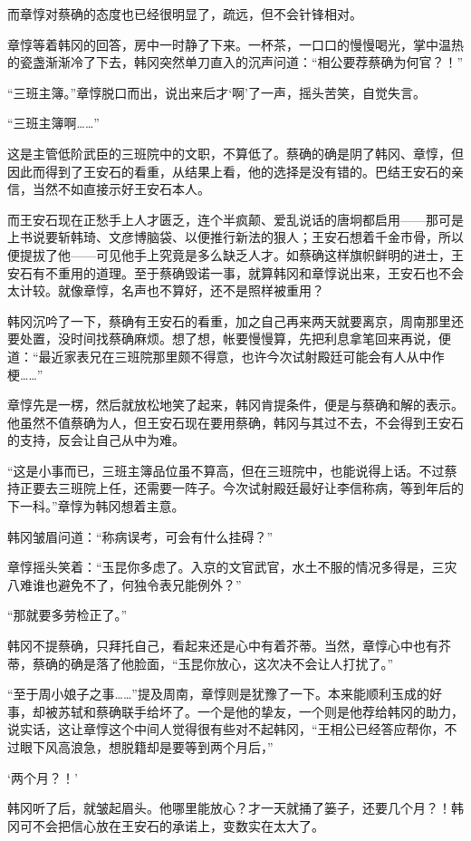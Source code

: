 而章惇对蔡确的态度也已经很明显了，疏远，但不会针锋相对。

章惇等着韩冈的回答，房中一时静了下来。一杯茶，一口口的慢慢喝光，掌中温热的瓷盏渐渐冷了下去，韩冈突然单刀直入的沉声问道：“相公要荐蔡确为何官？！”

“三班主簿。”章惇脱口而出，说出来后才‘啊’了一声，摇头苦笑，自觉失言。

“三班主簿啊……”

这是主管低阶武臣的三班院中的文职，不算低了。蔡确的确是阴了韩冈、章惇，但因此而得到了王安石的看重，从结果上看，他的选择是没有错的。巴结王安石的亲信，当然不如直接示好王安石本人。

而王安石现在正愁手上人才匮乏，连个半疯颠、爱乱说话的唐坰都启用——那可是上书说要斩韩琦、文彦博脑袋、以便推行新法的狠人；王安石想着千金市骨，所以便提拔了他——可见他手上究竟是多么缺乏人才。如蔡确这样旗帜鲜明的进士，王安石有不重用的道理。至于蔡确毁诺一事，就算韩冈和章惇说出来，王安石也不会太计较。就像章惇，名声也不算好，还不是照样被重用？

韩冈沉吟了一下，蔡确有王安石的看重，加之自己再来两天就要离京，周南那里还要处置，没时间找蔡确麻烦。想了想，帐要慢慢算，先把利息拿笔回来再说，便道：“最近家表兄在三班院那里颇不得意，也许今次试射殿廷可能会有人从中作梗……”

章惇先是一楞，然后就放松地笑了起来，韩冈肯提条件，便是与蔡确和解的表示。他虽然不值蔡确为人，但王安石现在要用蔡确，韩冈与其过不去，不会得到王安石的支持，反会让自己从中为难。

“这是小事而已，三班主簿品位虽不算高，但在三班院中，也能说得上话。不过蔡持正要去三班院上任，还需要一阵子。今次试射殿廷最好让李信称病，等到年后的下一科。”章惇为韩冈想着主意。

韩冈皱眉问道：“称病误考，可会有什么挂碍？”

章惇摇头笑着：“玉昆你多虑了。入京的文官武官，水土不服的情况多得是，三灾八难谁也避免不了，何独令表兄能例外？”

“那就要多劳检正了。”

韩冈不提蔡确，只拜托自己，看起来还是心中有着芥蒂。当然，章惇心中也有芥蒂，蔡确的确是落了他脸面，“玉昆你放心，这次决不会让人打扰了。”

“至于周小娘子之事……”提及周南，章惇则是犹豫了一下。本来能顺利玉成的好事，却被苏轼和蔡确联手给坏了。一个是他的挚友，一个则是他荐给韩冈的助力，说实话，这让章惇这个中间人觉得很有些对不起韩冈，“王相公已经答应帮你，不过眼下风高浪急，想脱籍却是要等到两个月后，”

‘两个月？！’

韩冈听了后，就皱起眉头。他哪里能放心？才一天就捅了篓子，还要几个月？！韩冈可不会把信心放在王安石的承诺上，变数实在太大了。

